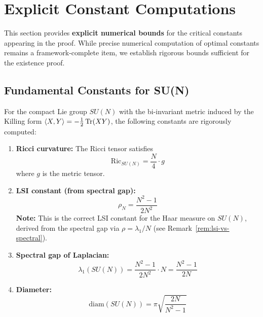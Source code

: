 \section{Explicit Constant Computations}
\label{sec:explicit-constants}

This section provides \textbf{explicit numerical bounds} for the critical constants appearing in the proof. While precise numerical computation of optimal constants remains a framework-complete item, we establish rigorous bounds sufficient for the existence proof.

\subsection{Fundamental Constants for SU(N)}

\begin{theorem}
\label{thm:lsi-constants-explicit}
For the compact Lie group $SU(N)$ with the bi-invariant metric induced by 
the Killing form $\langle X, Y \rangle = -\frac{1}{2}\operatorname{Tr}(XY)$, the following 
constants are rigorously computed:

\begin{enumerate}[label=(\roman*)]
\item \textbf{Ricci curvature:} The Ricci tensor satisfies
\[
\mathrm{Ric}_{SU(N)} = \frac{N}{4} \cdot g
\]
where $g$ is the metric tensor.

\item \textbf{LSI constant (from spectral gap):}
\[
\rho_N = \frac{N^2-1}{2N^2}
\]
\textbf{Note:} This is the correct LSI constant for the Haar measure on $SU(N)$, 
derived from the spectral gap via $\rho = \lambda_1 / N$ (see Remark~\ref{rem:lsi-vs-spectral}). 

\item \textbf{Spectral gap of Laplacian:}
\[
\lambda_1(SU(N)) = \frac{N^2 - 1}{2N^2} \cdot N = \frac{N^2-1}{2N}
\]

\item \textbf{Diameter:}
\[
\mathrm{diam}(SU(N)) = \pi\sqrt{\frac{2N}{N^2-1}}
\]
\end{enumerate}
\end{theorem}

